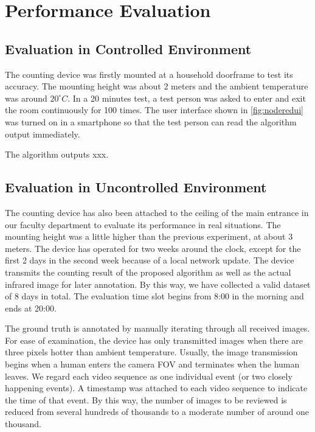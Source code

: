 \chapter{Performance Evaluation} \label{ch:evaluation}
\section{Evaluation in Controlled Environment}
The counting device was firstly mounted at a household doorframe to test its accuracy. The mounting height was about 2 meters and the ambient temperature was around $20^\circ C$. In a 20 minutes test, a test person was asked to enter and exit the room continuously for 100 times. The user interface shown in \autoref{fig:noderedui} was turned on in a smartphone so that the test person can read the algorithm output immediately.

The algorithm outputs xxx.
\section{Evaluation in Uncontrolled Environment}
The counting device has also been attached to the ceiling of the main entrance in our faculty department to evaluate its performance in real situations. The mounting height was a little higher than the previous experiment, at about 3 meters. The device has operated for two weeks around the clock, except for the first 2 days in the second week because of a local network update. The device transmits the counting result of the proposed algorithm as well as the actual infrared image for later annotation. By this way, we have collected a valid dataset of 8 days in total. The evaluation time slot begins from 8:00 in the morning and ends at 20:00.

The ground truth is annotated by manually iterating through all received images. For ease of examination, the device has only transmitted images when there are three pixels hotter than ambient temperature. Usually, the image transmission begins when a human enters the camera FOV and terminates when the human leaves. We regard each video sequence as one individual event (or two closely happening events). A timestamp was attached to each video sequence to indicate the time of that event. By this way, the number of images to be reviewed is reduced from several hundreds of thousands to a moderate number of around one thousand.

